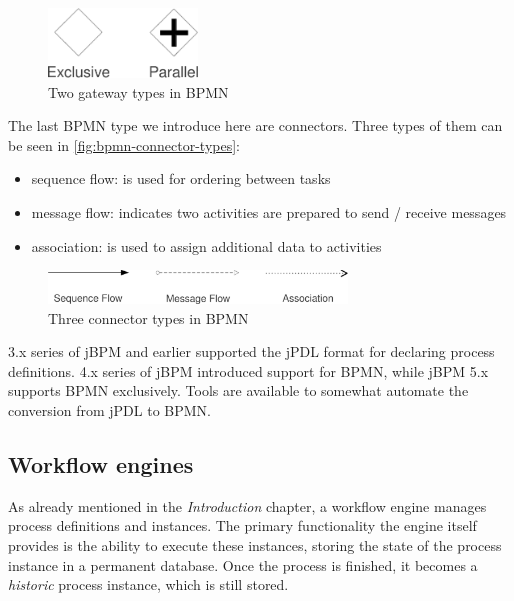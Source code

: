 \begin{figure}[H]
\centering
\includegraphics[width=150px,keepaspectratio]{bpmn-gateway-types.pdf}
\caption{Two gateway types in BPMN}
\label{fig:bpmn-gateway-types}
\end{figure}

The last BPMN type we introduce here are connectors. Three types of them can be
seen in \autoref{fig:bpmn-connector-types}:

\begin{itemize}
\item sequence flow: is used for ordering between tasks
\item message flow: indicates two activities are prepared to send / receive messages
\item association: is used to assign additional data to activities
\end{itemize}

\begin{figure}[H]
\centering
\includegraphics[width=300px,keepaspectratio]{bpmn-connector-types.pdf}
\caption{Three connector types in BPMN}
\label{fig:bpmn-connector-types}
\end{figure}


3.x series of jBPM and earlier supported the jPDL format for declaring process definitions.
4.x series of jBPM introduced support for BPMN, while jBPM 5.x supports BPMN exclusively.
Tools are available to somewhat automate the conversion from jPDL to BPMN.

\subsection{Workflow engines}


As already mentioned in the \emph{Introduction} chapter, a workflow engine
manages process definitions and instances. The primary functionality the engine
itself provides is the ability to execute these instances, storing the state of
the process instance in a permanent database. Once the process is finished, it
becomes a \emph{historic} process instance, which is still stored.

